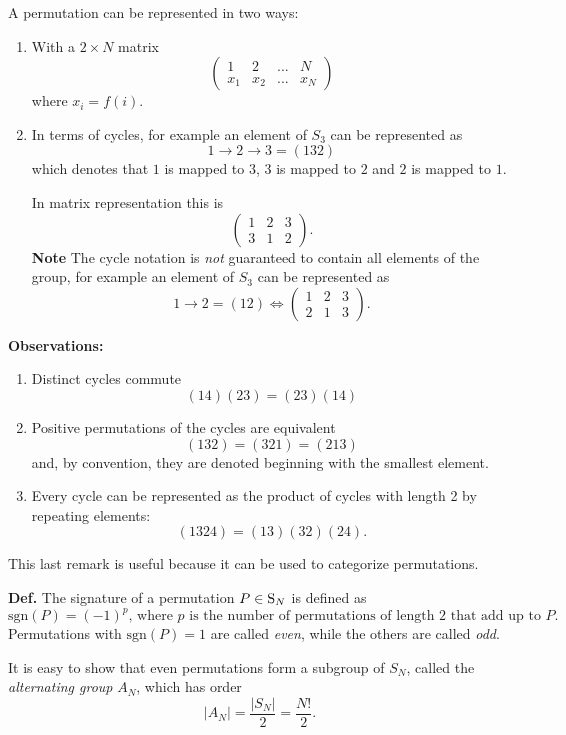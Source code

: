 A permutation can be represented in two ways:
\begin{enumerate}
    \item With a $2\times N$ matrix
        $$\begin{pmatrix}
              1&2&...&N \\
              x_1&x_2&...&x_N
          \end{pmatrix}$$
        where $x_i=f(i)$.
    \item In terms of cycles, for example an element of $S_3$ can be represented as
        $$1\to2\to3 = (132)$$
        which denotes that $1$ is mapped to $3$, $3$ is mapped to $2$ and $2$ is
        mapped to $1$.

        In matrix representation this is
        $$\begin{pmatrix}
            1&2&3\\
            3&1&2
        \end{pmatrix}.
        $$
    \textbf{Note} The cycle notation is \textit{not} guaranteed to contain all
    elements of the group, for example an element of $S_3$ can be represented as
    $$1\to2 = (12) \iff  \begin{pmatrix}
        1&2&3\\
        2&1&3
    \end{pmatrix}.
    $$
\end{enumerate}
\textbf{Observations:}
\begin{enumerate}
    \item Distinct cycles commute
    $$(14)(23) = (23)(14)$$
    \item Positive permutations of the cycles are equivalent
        $$(132)=(321)=(213)$$
        and, by convention, they are denoted beginning with the smallest element.
    \item Every cycle can be represented as the product of cycles with length 2 by
        repeating elements:
        $$(1324) = (13)(32)(24).$$
\end{enumerate}
This last remark is useful because it can be used to categorize permutations.

\textbf{Def.} The signature of a permutation $P\in\text S_N$ is defined as
$$\text{sgn}(P) = (-1)^p\text{, where $p$ is the number of permutations of length 2
that add up to $P$.}$$
Permutations with $\text{sgn}(P)=1$ are called \textit{even}, while the others are
called \textit{odd}.

It is easy to show that even permutations form a subgroup of $S_N$, called
the \textit{alternating group} $A_N$, which has order
$$|A_N| = \frac{|S_N|}{2} = \frac{N!}{2}.$$

